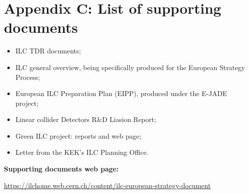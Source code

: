 \documentclass[%
 reprint,
 floatfix,
 amsmath,amssymb,
 aps,
]{revtex4-1}
\begin{document}
\newpage

\section*{\label{Appendix3} \Large{Appendix C: List of supporting documents} }
\begin{itemize}
\item
ILC TDR documents;
\item
ILC general overview, being specifically produced for the European Strategy Process;
\item
European ILC Preparation Plan (EIPP), produced under the E-JADE project;
\item
Linear collider Detectors R\&D Liasion Report;
\item
Green ILC project: reports and web page;
\item
Letter from the KEK’s ILC Planning Office.

\end{itemize}

\textbf{Supporting documents web page:} 


\url{https://ilchome.web.cern.ch/content/ilc-european-strategy-document}
\end{document}
